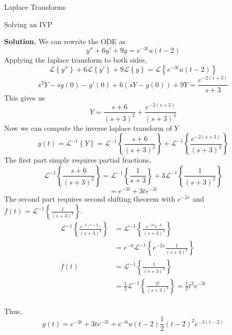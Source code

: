 \documentclass{article}
\newcommand{\laplace}[1]{\mathcal{L}\left\{#1\right\}}
\newcommand{\ilaplace}[1]{\mathcal{L}^{-1}\left\{#1\right\}}
\begin{document}
\begin{multicols*}{3}
\begin{blackbox}{Laplace Transforms}
\begin{brownbox}{Solving an IVP}
{                \noindent
                \textbf{Solution.} We can rewrite the ODE as \\[-2ex]
                \[y'' + 6y' + 9y = e^{-3t}u(t-2)\]
                Applying the laplace transform to both sides,\\[-2ex] 
                \[\laplace{y''} + 6\laplace{y'} + 9\laplace{y} = \laplace{e^{-3t}u(t-2)}\]
                \vspace{-3.5ex}
                \[s^2Y - sy(0) - y'(0) + 6(sY - y(0)) + 9Y= \frac{e^{-2(s+3)}}{s+3}\]
                This gives us \\[-4ex]
                \[Y = \frac{s+6}{(s+3)^2} + \frac{e^{-2(s+3)}}{(s+3)^3}\]
                Now we can compute the inverse laplace transform of $Y$\\[-2ex]
                \[y(t) = \ilaplace{Y} = \ilaplace{\frac{s+6}{(s+3)^2}} + \ilaplace{\frac{e^{-2(s+3)}}{(s+3)^3}}\]
                The first part simply requires partial fractions, \\[-2ex]
                \[\ilaplace{\frac{s+6}{(s+3)^2}} = \ilaplace{\frac{1}{s+3}} + 3\ilaplace{\frac{1}{(s+3)^2}}\]
                \[=e^{-3t} + 3te^{-3t}\] 
                The second part requires second shifting theorem with $e^{-2s}$ and $f(t) = \ilaplace{\frac{1}{(s+3)^3}}$. \\[-2ex]
               \begin{align*}
                \ilaplace{\frac{e^{-2(s+3)}}{(s+3)^3}} &= \ilaplace{\frac{e^{-2s}e^{-6}}{(s+3)^3}}\\
                &= e^{-6}\ilaplace{e^{-2s}\frac{1}{(s+3)^3}} \\
                f(t) &= \ilaplace{\frac{1}{(s+3)^3}}\\
                &= \frac{1}{2}\ilaplace{\frac{2!}{(s+3)^3}} =  \frac{1}{2}t^2e^{-3t}\\
            \end{align*}
            \vspace{-9.25ex} 

            Thus,\\[-3ex] 
            \[y(t) = e^{-3t} + 3te^{-3t} + e^{-6}u(t-2)\frac{1}{2}(t-2)^2e^{-3(t-2)}\]
                }
                \end{brownbox}\\[-2ex]
            \end{blackbox}
    \end{multicols*}
\end{document}
